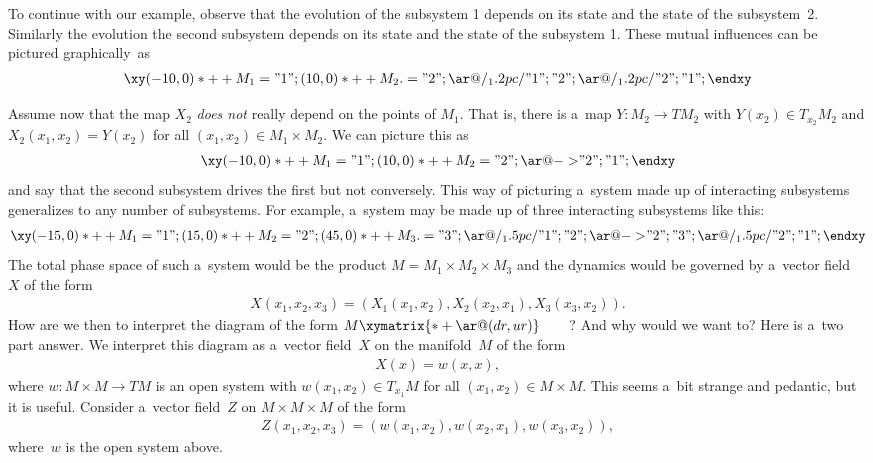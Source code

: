 \documentclass[pdftex]{sigma}
\numberwithin{equation}{section}
\begin{document}
To continue with our example, observe that the evolution of the subsystem 1 depends on its state and the state of the subsystem~2.
Similarly the evolution the second subsystem depends on its state and the state of the subsystem 1.
These mutual inf\/luences can be pictured graphically~as
\begin{gather*}
\xy
(-10,0)*++{M_1}="1";
(10,0)*++{M_2.}="2";
{\ar@/_1.2pc/ "1";"2"};
{\ar@/_1.2pc/ "2";"1"};
\endxy
\end{gather*}

Assume now that the map $X_2$ {\em does not} really depend on the points of $M_1$.
That is, there is a~map $Y:M_2 \to TM_2$ with $Y(x_2) \in T_{x_2}M_2$ and $X_2(x_1,x_2) = Y(x_2)$ for all $(x_1,x_2)\in
M_1\times M_2$.
We can picture this as
\begin{gather*}
\xy
(-10,0)*++{M_1}="1";
(10,0)*++{M_2}="2";
{\ar@{->} "2";"1"};
\endxy
\end{gather*}
and say that the second subsystem drives the f\/irst but not conversely.
This way of picturing a~system made up of interacting subsystems generalizes to any number of subsystems.
For example, a~system may be made up of three interacting subsystems like this:
\begin{gather}
\label{eq:favorite}
\xy
(-15,0)*++{M_1}="1";
(15,0)*++{M_2}="2";
(45,0)*++{M_3.}="3";
{\ar@/_1.5pc/ "1";"2"};
{\ar@{->}_{} "2";"3"};
{\ar@/_1.5pc/ "2";"1"};
\endxy
\end{gather}
The total phase space of such a~system would be the product $M=M_1\times M_2 \times M_3$ and the dynamics would be
governed by a~vector f\/ield~$X$ of the form
\begin{gather*}
X(x_1,x_2, x_3) = (X_1(x_1, x_2), X_2 (x_2, x_1), X_3(x_3, x_2)).
\end{gather*}
How are we then to interpret the diagram of the form $ M \xymatrix{*+{ } \ar@(dr,ur)}$~~~~?
And why would we want to? Here is a~two part answer.
We interpret this diagram as a~vector f\/ield~$X$ on the manifold~$M$ of the form
\begin{gather*}
X(x) = w(x,x),
\end{gather*}
where $w:M\times M\to TM$ is an open system with $w(x_1,x_2) \in T_{x_1} M$ for all $(x_1,x_2) \in M\times M$.
This seems a~bit strange and pedantic, but it is useful.
Consider a~vector f\/ield~$Z$ on $M\times M\times M$ of the form
\begin{gather*}
Z(x_1,x_2, x_3) = (w(x_1, x_2), w(x_2,x_1), w(x_3,x_2)),
\end{gather*}
where~$w$ is the open system above.
\end{document}
